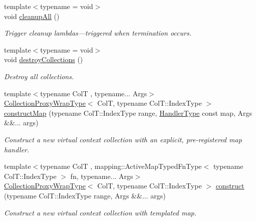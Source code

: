 \begin{DoxyCompactItemize}
{\footnotesize template$<$typename  = void$>$ }\\void \hyperlink{structvt_1_1vrt_1_1collection_1_1_collection_manager_a7d98e5aaa63d70cbabfbcf78a6cf503f}{cleanup\+All} ()
\begin{DoxyCompactList}\small\item\em Trigger cleanup lambdas---triggered when termination occurs. \end{DoxyCompactList}\item 
{\footnotesize template$<$typename  = void$>$ }\\void \hyperlink{structvt_1_1vrt_1_1collection_1_1_collection_manager_a71865b0508bab58b6d44b44416f11983}{destroy\+Collections} ()
\begin{DoxyCompactList}\small\item\em Destroy all collections. \end{DoxyCompactList}\item 
{\footnotesize template$<$typename ColT , typename... Args$>$ }\\\hyperlink{structvt_1_1vrt_1_1collection_1_1_collection_manager_a56458ed7f9bb22b631b9b3a745f42f94}{Collection\+Proxy\+Wrap\+Type}$<$ ColT, typename Col\+T\+::\+Index\+Type $>$ \hyperlink{structvt_1_1vrt_1_1collection_1_1_collection_manager_a16b7c5e765f828a711bbfa0b1a4b8737}{construct\+Map} (typename Col\+T\+::\+Index\+Type range, \hyperlink{namespacevt_af64846b57dfcaf104da3ef6967917573}{Handler\+Type} const map, Args \&\&... args)
\begin{DoxyCompactList}\small\item\em Construct a new virtual context collection with an explicit, pre-\/registered map handler. \end{DoxyCompactList}\item 
{\footnotesize template$<$typename ColT , mapping\+::\+Active\+Map\+Typed\+Fn\+Type$<$ typename Col\+T\+::\+Index\+Type $>$ fn, typename... Args$>$ }\\\hyperlink{structvt_1_1vrt_1_1collection_1_1_collection_manager_a56458ed7f9bb22b631b9b3a745f42f94}{Collection\+Proxy\+Wrap\+Type}$<$ ColT, typename Col\+T\+::\+Index\+Type $>$ \hyperlink{structvt_1_1vrt_1_1collection_1_1_collection_manager_a4de84e9efd7a3948e3c20be549441cfd}{construct} (typename Col\+T\+::\+Index\+Type range, Args \&\&... args)
\begin{DoxyCompactList}\small\item\em Construct a new virtual context collection with templated map. \end{DoxyCompactList}\item 

\end{DoxyCompactItemize}

